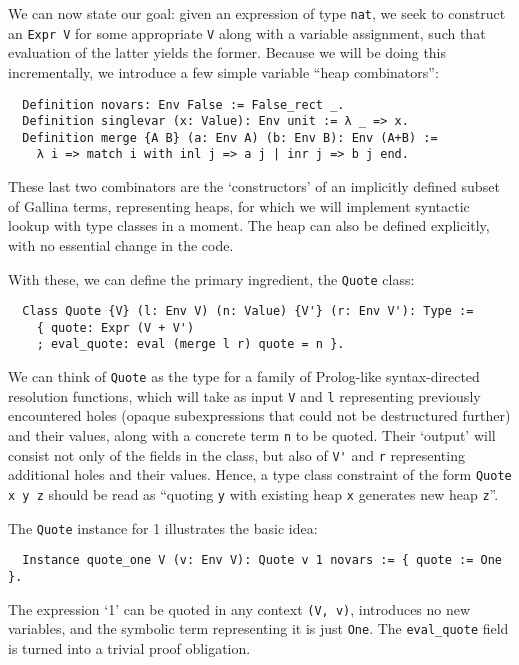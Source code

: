 \documentclass[a4paper,10pt,runningheads]{llncs}
\begin{document}

We can now state our goal: given an expression of type \lstinline|nat|, we seek to construct an \lstinline|Expr V| for some appropriate \lstinline|V| along with a variable assignment, such that evaluation of the latter yields the former. Because we will be doing this incrementally, we introduce a few simple variable ``heap combinators'':
\begin{lstlisting}
  Definition novars: Env False := False_rect _.
  Definition singlevar (x: Value): Env unit := λ _ => x.
  Definition merge {A B} (a: Env A) (b: Env B): Env (A+B) :=
    λ i => match i with inl j => a j | inr j => b j end.
\end{lstlisting}
These last two combinators are the `constructors' of an implicitly defined subset of Gallina terms, representing heaps, for which we will implement syntactic lookup with type classes in a moment. The heap can also be defined explicitly, with no essential change in the code.

With these, we can define the primary ingredient, the \lstinline|Quote| class:
\begin{lstlisting}
  Class Quote {V} (l: Env V) (n: Value) {V'} (r: Env V'): Type :=
    { quote: Expr (V + V')
    ; eval_quote: eval (merge l r) quote = n }.
\end{lstlisting}
We can think of \lstinline|Quote| as the type for a family of Prolog-like syntax-directed resolution functions, which will take as input \lstinline|V| and \lstinline|l| representing previously encountered holes (opaque subexpressions that could not be destructured further) and their values, along with a concrete term \lstinline|n| to be quoted. Their `output' will consist not only of the fields in the class, but also of \lstinline|V'| and \lstinline|r| representing additional holes and their values. Hence, a type class constraint of the form \lstinline|Quote x y z| should be read as ``quoting \lstinline|y| with existing heap \lstinline|x| generates new heap \lstinline|z|''.

The \lstinline|Quote| instance for 1 illustrates the basic idea:
\begin{lstlisting}
  Instance quote_one V (v: Env V): Quote v 1 novars := { quote := One }.
\end{lstlisting}
The expression `1' can be quoted in any context \lstinline|(V, v)|, introduces no new variables, and the symbolic term representing it is just \lstinline|One|. The \lstinline|eval_quote| field is turned into a trivial proof obligation.
\end{document}
